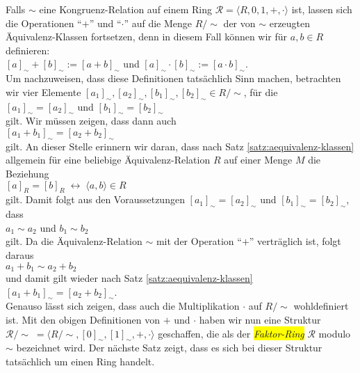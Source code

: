 Falls $\sim$ eine Kongruenz-Relation auf einem Ring $\mathcal{R} = \langle R, 0, 1, +, \cdot \rangle$ ist,
lassen sich die Operationen ``$+$'' und ``$\cdot$'' auf die Menge $R/\!\sim$ der von $\sim$ erzeugten
\"{A}quivalenz-Klassen fortsetzen, denn in diesem Fall k\"{o}nnen wir f\"{u}r $a,b \in R$ definieren:
\\[0.2cm]
\hspace*{1.3cm}
$[a]_\sim + [b]_\sim := [ a + b ]_\sim$ \quad und \quad
$[a]_\sim \cdot [b]_\sim := [ a \cdot b ]_\sim$.
\\[0.2cm]
Um nachzuweisen, dass diese Definitionen tats\"{a}chlich Sinn machen, betrachten wir vier
 Elemente $[a_1]_\sim, [a_2]_\sim, [b_1]_\sim, [b_2]_\sim \in R/\!\sim$, f\"{u}r die
\\[0.2cm]
\hspace*{1.3cm}
$[a_1]_\sim = [a_2]_\sim$ \quad und \quad
$[b_1]_\sim = [b_2]_\sim$ 
\\[0.2cm]
gilt.  Wir m\"{u}ssen zeigen, dass dann auch 
\\[0.2cm]
\hspace*{1.3cm}
$[a_1 + b_1]_\sim = [a_2 + b_2]_\sim$
\\[0.2cm]
gilt.  An dieser Stelle erinnern wir daran, dass nach Satz \ref{satz:aequivalenz-klassen}
allgemein f\"{u}r eine beliebige \"{A}quivalenz-Relation $R$ auf einer Menge $M$ die Beziehung
\\[0.2cm]
\hspace*{1.3cm}
$[a]_R = [b]_R \;\leftrightarrow\; \langle a, b \rangle \in R$
\\[0.2cm]
gilt.  Damit folgt aus den Voraussetzungen $[a_1]_\sim = [a_2]_\sim$ und $[b_1]_\sim = [b_2]_\sim$, dass
\\[0.2cm]
\hspace*{1.3cm}
$a_1 \sim a_2$ \quad und \quad $b_1 \sim b_2$
\\[0.2cm]
gilt.
Da die \"{A}quivalenz-Relation $\sim$ mit der Operation ``$+$'' vertr\"{a}glich ist, folgt daraus
\\[0.2cm]
\hspace*{1.3cm}
$a_1 + b_1 \sim  a_2 + b_2$ 
\\[0.2cm]
und damit gilt wieder nach Satz \ref{satz:aequivalenz-klassen} 
\\[0.2cm]
\hspace*{1.3cm}
$[a_1 + b_1]_\sim = [a_2 + b_2]_\sim$. 
\\[0.2cm]
Genauso l\"{a}sst sich zeigen, dass auch die Multiplikation $\cdot$ auf $R/\!\sim$ wohldefiniert ist.
Mit den obigen  Definitionen von $+$ und $\cdot$ haben wir nun eine Struktur 
$\mathcal{R}/\!\sim\; = \langle R/\!\sim, [0]_\sim, [1]_\sim, +, \cdot \rangle$ geschaffen, die als der
\colorbox{yellow}{\emph{Faktor-Ring}} $\mathcal{R}$ modulo $\sim$ bezeichnet wird. 
Der n\"{a}chste Satz zeigt, dass es sich bei dieser Struktur tats\"{a}chlich um einen Ring handelt.

